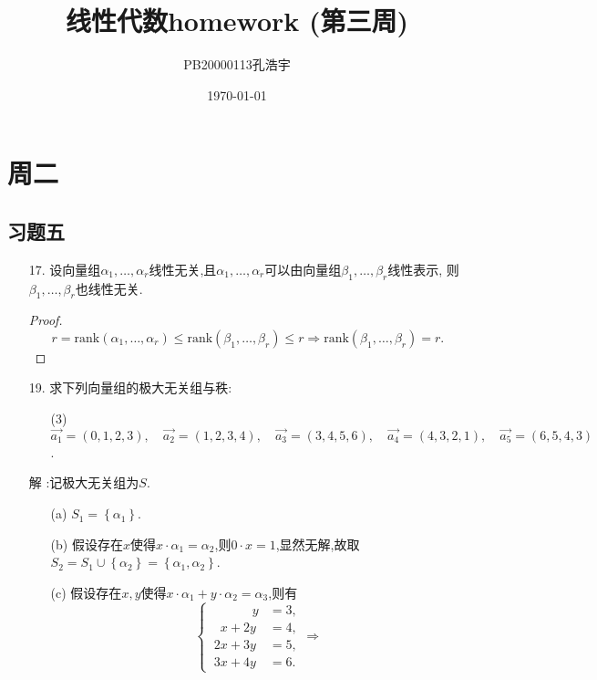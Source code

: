 \documentclass{article}
\title{线性代数homework (第三周)}
\author{PB20000113孔浩宇}
\date{\today}
\begin{document}
\maketitle
\section{周二}
\subsection{习题五}
\begin{enumerate}
    \item [17.]设向量组$\alpha_1,\ldots,\alpha_r$线性无关,且$\alpha_1,\ldots,\alpha_r$可以由向量组$\beta_1,\ldots,\beta_r$线性表示,
    则$\beta_1,\ldots,\beta_r$也线性无关.
    \begin{proof}
        \[
            r=
            \mbox{rank}(\alpha_1,\ldots,\alpha_r)
            \leqslant
            \mbox{rank}(\beta_1,\ldots,\beta_r)
            \leqslant r 
            \Rightarrow \mbox{rank}(\beta_1,\ldots,\beta_r)=r.
            \]
    \end{proof}
    \item [19.]求下列向量组的极大无关组与秩:\begin{enumerate}
        \item [(3)]
        $\overrightarrow{a_1}=(0,1,2,3),\quad \overrightarrow{a_2}=(1,2,3,4),\quad \overrightarrow{a_3}=(3,4,5,6),\quad \overrightarrow{a_4}=(4,3,2,1),\quad \overrightarrow{a_5}=(6,5,4,3)$.
    \end{enumerate}
    \item [解]:记极大无关组为$S$.
    \begin{enumerate}
            \item [(a)]$S_1=\left\{\alpha_1\right\}$.
            \item [(b)]假设存在$x$使得$x\cdot \alpha_1=\alpha_2$,则$0\cdot x=1$,显然无解,故取$S_2=S_1\cup \left\{\alpha_2\right\}=\left\{\alpha_1,\alpha_2\right\}$.
            \item [(c)]假设存在$x,y$使得$x\cdot \alpha_1+y\cdot \alpha_2=\alpha_3$,则有
            \[
                \begin{cases}
                    \ \qquad \quad y &=3,\\
                    \ \ \;x+2y &=4,\\
                    \ 2x+3y &=5,\\
                    \ 3x+4y &=6.
                \end{cases}
                \Rightarrow
\]
\end{enumerate}
\end{enumerate}
\end{document}
